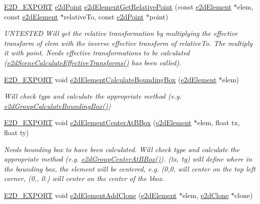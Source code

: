 \begin{DoxyCompactItemize}
\hyperlink{Ez2DS_8h_a9f14e9cb869e1a85fdaba03afcca0df9}{E2\-D\-\_\-\-E\-X\-P\-O\-R\-T} \hyperlink{structe2dPoint}{e2d\-Point} \hyperlink{group__e2dElement_gae6b6f57ac5505ef9181289197d419536}{e2d\-Element\-Get\-Relative\-Point} (const \hyperlink{structe2dElement}{e2d\-Element} $\ast$elem, const \hyperlink{structe2dElement}{e2d\-Element} $\ast$relative\-To, const \hyperlink{structe2dPoint}{e2d\-Point} $\ast$point)
\begin{DoxyCompactList}\small\item\em U\-N\-T\-E\-S\-T\-E\-D Will get the relative transformation by multiplying the effective transform of elem with the inverse effective transform of relative\-To. The multiply it with point. Needs effective transformations to be calculated (\hyperlink{group__e2dScene_ga6981f2448904c96723449cb84ffb4d8a}{e2d\-Scene\-Calculate\-Effective\-Transforms()} has been called). \end{DoxyCompactList}\item 
\hyperlink{Ez2DS_8h_a9f14e9cb869e1a85fdaba03afcca0df9}{E2\-D\-\_\-\-E\-X\-P\-O\-R\-T} void \hyperlink{group__e2dElement_ga575c7363927670f1ea8c52b7ea23fcd5}{e2d\-Element\-Calculate\-Bounding\-Box} (\hyperlink{structe2dElement}{e2d\-Element} $\ast$elem)
\begin{DoxyCompactList}\small\item\em Will check type and calculate the appropriate method (e.\-g. \hyperlink{group__e2dGroup_gacf5659083b312e030456721b2560d4f4}{e2d\-Group\-Calculate\-Bounding\-Box()}) \end{DoxyCompactList}\item 
\hyperlink{Ez2DS_8h_a9f14e9cb869e1a85fdaba03afcca0df9}{E2\-D\-\_\-\-E\-X\-P\-O\-R\-T} void \hyperlink{group__e2dElement_gab829b280fa22a3509c40425fc84b5061}{e2d\-Element\-Center\-At\-B\-Box} (\hyperlink{structe2dElement}{e2d\-Element} $\ast$elem, float tx, float ty)
\begin{DoxyCompactList}\small\item\em Needs bounding box to have been calculated. Will check type and calculate the appropriate method (e.\-g. \hyperlink{group__e2dGroup_ga2800a7dc3827e8753e2f2c6ef2e05eb9}{e2d\-Group\-Center\-At\-B\-Box()}). (tx, ty) will define where in the bounding box, the element will be centered, e.\-g. (0,0, will center on the top left corner, (0., 0.) will center on the center of the bbox. \end{DoxyCompactList}\item 
\hyperlink{Ez2DS_8h_a9f14e9cb869e1a85fdaba03afcca0df9}{E2\-D\-\_\-\-E\-X\-P\-O\-R\-T} void \hyperlink{group__e2dElement_ga80b7a45c28ec6e95d97b0316358a3290}{e2d\-Element\-Add\-Clone} (\hyperlink{structe2dElement}{e2d\-Element} $\ast$elem, \hyperlink{structe2dClone}{e2d\-Clone} $\ast$clone)

\end{DoxyCompactItemize}
